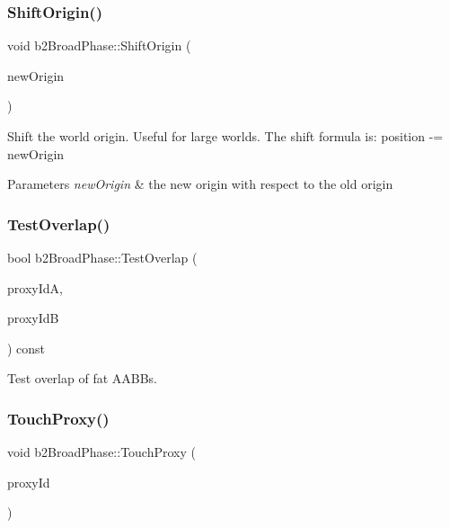 \subsubsection{\texorpdfstring{ShiftOrigin()}{ShiftOrigin()}}
{\footnotesize\ttfamily void b2\+Broad\+Phase\+::\+Shift\+Origin (\begin{DoxyParamCaption}\item[{const \mbox{\hyperlink{structb2_vec2}{b2\+Vec2}} \&}]{new\+Origin }\end{DoxyParamCaption})\hspace{0.3cm}{\ttfamily [inline]}}

Shift the world origin. Useful for large worlds. The shift formula is\+: position -\/= new\+Origin 
\begin{DoxyParams}{Parameters}
{\em new\+Origin} & the new origin with respect to the old origin \\
\hline
\end{DoxyParams}
\mbox{\label{classb2_broad_phase_a263cc21e2a3f1f892c20b048eca3cad6}} 
\subsubsection{\texorpdfstring{TestOverlap()}{TestOverlap()}}
{\footnotesize\ttfamily bool b2\+Broad\+Phase\+::\+Test\+Overlap (\begin{DoxyParamCaption}\item[{\mbox{\hyperlink{b2_settings_8h_a43d43196463bde49cb067f5c20ab8481}{int32}}}]{proxy\+IdA,  }\item[{\mbox{\hyperlink{b2_settings_8h_a43d43196463bde49cb067f5c20ab8481}{int32}}}]{proxy\+IdB }\end{DoxyParamCaption}) const\hspace{0.3cm}{\ttfamily [inline]}}



Test overlap of fat A\+A\+B\+Bs. 

\mbox{\label{classb2_broad_phase_a67b296431ebbc7b44037f21d645d9166}} 
\subsubsection{\texorpdfstring{TouchProxy()}{TouchProxy()}}
{\footnotesize\ttfamily void b2\+Broad\+Phase\+::\+Touch\+Proxy (\begin{DoxyParamCaption}\item[{\mbox{\hyperlink{b2_settings_8h_a43d43196463bde49cb067f5c20ab8481}{int32}}}]{proxy\+Id }\end{DoxyParamCaption})}



